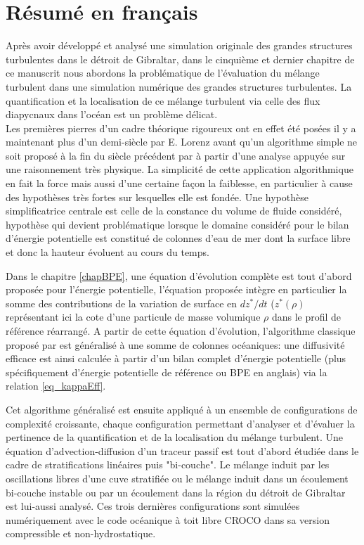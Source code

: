 \section{Résumé en français}
Après avoir développé et analysé une simulation originale des grandes structures turbulentes dans le détroit de Gibraltar, dans le cinquième et dernier chapitre de ce manuscrit nous abordons la problématique de l'évaluation du mélange turbulent dans une simulation numérique des grandes structures turbulentes. La quantification et la localisation de ce mélange turbulent via celle des flux diapycnaux dans l'océan est un problème délicat.\\
Les premières pierres d'un cadre théorique rigoureux ont en effet été posées il y a maintenant plus d'un demi-siècle par E. Lorenz \citep{lorenz_available_1955} avant qu'un algorithme simple ne soit proposé à la fin du siècle précédent par \cite{winters_available_1995} à partir d'une analyse appuyée sur une raisonnement très physique. La simplicité de cette application algorithmique en fait la force mais aussi d'une certaine façon la faiblesse, en particulier à cause des hypothèses très fortes sur lesquelles elle est fondée. Une hypothèse simplificatrice centrale est celle de la constance du volume de fluide considéré, hypothèse qui devient problématique lorsque le domaine considéré pour le bilan d'énergie potentielle est constitué de colonnes d'eau de mer dont la surface libre et donc la hauteur évoluent au cours du temps.

\color{blue}
Dans le chapitre \ref{chapBPE}, une équation d'évolution complète est tout d'abord proposée pour l'énergie potentielle, l'équation proposée intègre en particulier la somme des contributions de la variation de surface en $dz^*/dt$ ($z^*(\rho)$ représentant ici la cote d'une particule de masse volumique $\rho$ dans le profil de référence réarrangé. A partir de cette équation d'évolution, l'algorithme classique proposé par \cite{winters_available_1995} est généralisé à une somme de colonnes océaniques: une diffusivité efficace est ainsi calculée à partir d'un bilan complet d'énergie potentielle (plus spécifiquement d'énergie potentielle de référence ou BPE en anglais) via la relation \ref{eq_kappaEff}.

Cet algorithme généralisé est ensuite appliqué à un ensemble de configurations de complexité croissante, chaque configuration permettant d'analyser et d'évaluer la pertinence de la quantification et de la localisation du mélange turbulent. Une équation d'advection-diffusion d'un traceur passif est tout d'abord étudiée dans le cadre de stratifications linéaires puis "bi-couche". Le mélange induit par les oscillations libres d'une cuve stratifiée ou le mélange induit dans un écoulement bi-couche instable ou par un écoulement dans la région du détroit de Gibraltar est lui-aussi analysé. Ces trois dernières configurations sont simulées numériquement avec le code océanique à toit libre CROCO dans sa version compressible et non-hydrostatique.

